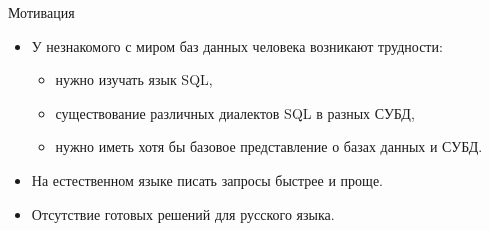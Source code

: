 \begin{frame}{Мотивация}%
  \begin{itemize}%
    \item У незнакомого с миром баз данных человека возникают трудности:
      \begin{itemize}%
        \item нужно изучать язык SQL,
        \item существование различных диалектов SQL в разных СУБД,
        \item нужно иметь хотя бы базовое представление о базах данных и СУБД.
      \end{itemize}
    \item На естественном языке писать запросы быстрее и проще.
    \item Отсутствие готовых решений для русского языка.
  \end{itemize}
\end{frame}
